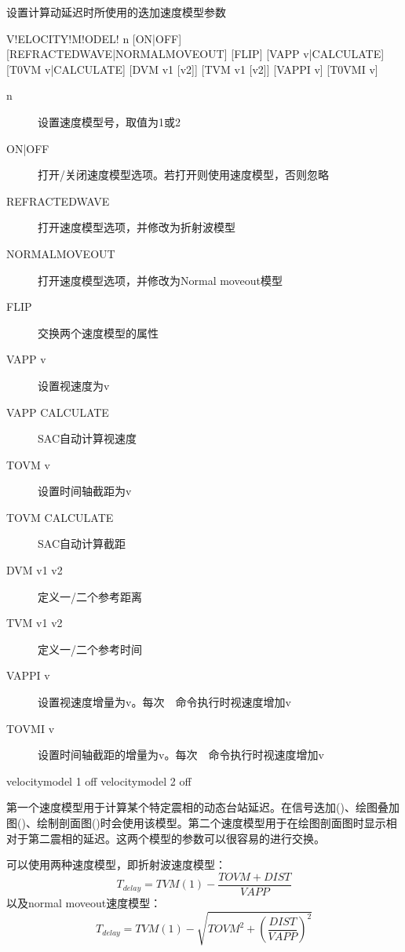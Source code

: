 \label{sss:velocitymodel}

设置计算动延迟时所使用的迭加速度模型参数

\begin{SACSTX}
V!ELOCITY!M!ODEL! n [ON|OFF] [REFRACTEDWAVE|NORMALMOVEOUT]
    [FLIP] [VAPP v|CALCULATE] [T0VM v|CALCULATE]
    [DVM v1 [v2]] [TVM v1 [v2]] [VAPPI v] [T0VMI v]
\end{SACSTX}

\begin{description}
\item [n] 设置速度模型号，取值为1或2
\item [ON|OFF] 打开/关闭速度模型选项。若打开则使用速度模型，否则忽略
\item [REFRACTEDWAVE] 打开速度模型选项，并修改为折射波模型
\item [NORMALMOVEOUT] 打开速度模型选项，并修改为Normal moveout模型
\item [FLIP] 交换两个速度模型的属性
\item [VAPP v] 设置视速度为v
\item [VAPP CALCULATE] SAC自动计算视速度
\item [TOVM v] 设置时间轴截距为v
\item [TOVM CALCULATE] SAC自动计算截距
\item [DVM v1 v2] 定义一/二个参考距离
\item [TVM v1 v2] 定义一/二个参考时间
\item [VAPPI v] 设置视速度增量为v。每次~~命令执行时视速度增加v
\item [TOVMI v] 设置时间轴截距的增量为v。每次~~命令执行时视速度增加v
\end{description}

\begin{SACDFT}
velocitymodel 1 off
velocitymodel 2 off
\end{SACDFT}

第一个速度模型用于计算某个特定震相的动态台站延迟。在信号迭加()、绘图叠加图()、绘制剖面图()时会使用该模型。第二个速度模型用于在绘图剖面图时显示相对于第二震相的延迟。这两个模型的参数可以很容易的进行交换。

可以使用两种速度模型，即折射波速度模型：
\[ T_{delay} = TVM(1) - \frac{TOVM+DIST}{VAPP} \]
以及normal moveout速度模型：
\[ T_{delay} = TVM(1) - \sqrt{TOVM^2 + (\frac{DIST}{VAPP})^2} \]

